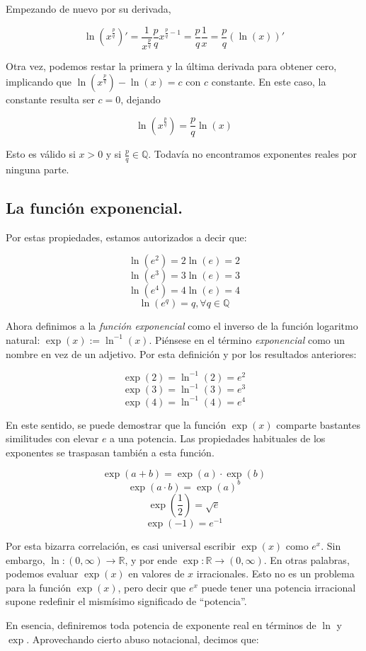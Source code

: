 Empezando de nuevo por su derivada,

$$\ln(x^{\frac{p}{q}})' = \frac{1}{x^{\frac{p}{q}}} \frac{p}{q} x^{\frac{p}{q} - 1} = \frac{p}{q} \frac{1}{x} = \frac{p}{q} (\ln(x))'$$

Otra vez, podemos restar la primera y la última derivada para obtener cero, implicando que $\ln(x^{\frac{p}{q}}) - \ln(x) = c$ con $c$ constante. En este caso, la constante resulta ser $c = 0$, dejando

$$\ln(x^{\frac{p}{q}}) = \frac{p}{q} \ln(x)$$

Esto es válido si $x > 0$ y si $\frac{p}{q} \in \mathbb{Q}$. Todavía no encontramos exponentes reales por ninguna parte.

\subsection{La función exponencial.}

Por estas propiedades, estamos autorizados a decir que:

$$\ln(e^2) = 2\ln(e) = 2$$
$$\ln(e^3) = 3\ln(e) = 3$$
$$\ln(e^4) = 4\ln(e) = 4$$
$$\ln(e^{q}) = q, \forall q \in \mathbb{Q}$$

Ahora definimos a la \textit{función exponencial} como el inverso de la función logaritmo natural: $\exp(x) := \ln^{-1}(x)$. Piénsese en el término \textit{exponencial} como un nombre en vez de un adjetivo. Por esta definición y por los resultados anteriores:

$$\exp(2) = \ln^{-1}(2) = e^2$$
$$\exp(3) = \ln^{-1}(3) = e^3$$
$$\exp(4) = \ln^{-1}(4) = e^4$$

En este sentido, se puede demostrar que la función $\exp(x)$ comparte bastantes similitudes con elevar $e$ a una potencia. Las propiedades habituales de los exponentes se traspasan también a esta función.

$$\exp(a + b) = \exp(a)\cdot \exp(b)$$
$$\exp(a \cdot b) = \exp(a)^b$$
$$\exp\left(\frac{1}{2}\right) = \sqrt{e}$$
$$\exp(-1) = e^{-1}$$

Por esta bizarra correlación, es casi universal escribir $\exp(x)$ como $e^x$. Sin embargo, $\ln: (0, \infty) \to \mathbb{R}$, y por ende $\exp: \mathbb{R} \to (0, \infty)$. En otras palabras, podemos evaluar $\exp(x)$ en valores de $x$ irracionales. Esto no es un problema para la función $\exp(x)$, pero decir que $e^x$ puede tener una potencia irracional supone redefinir el mismísimo significado de \enquote{potencia}.

En esencia, definiremos toda potencia de exponente real en términos de $\ln$ y $\exp$. Aprovechando cierto abuso notacional, decimos que:

